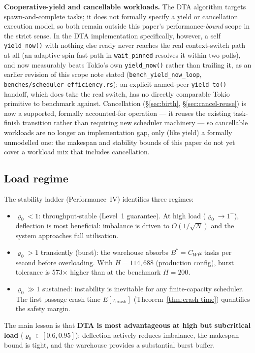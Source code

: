 \documentclass[11pt,a4paper]{report}
\newcommand{\dtact}{\textsc{DTA}}
\begin{document}
\medskip
\noindent\textbf{Cooperative-yield and cancellable workloads.}
The DTA algorithm targets spawn-and-complete tasks; it does not
formally specify a yield or cancellation execution model, so both
remain outside this paper's performance-\emph{bound} scope in the
strict sense. In the \dtact{} implementation specifically, however, a
self \texttt{yield\_now()} with nothing else ready never reaches the
real context-switch path at all (an adaptive-spin fast path in
\texttt{wait\_pinned} resolves it within two polls), and now
measurably beats Tokio's own \texttt{yield\_now()} rather than
trailing it, as an earlier revision of this scope note stated
(\texttt{bench\_yield\_now\_loop},
\texttt{benches/scheduler\_efficiency.rs}); an explicit named-peer
\texttt{yield\_to()} handoff, which does take the real switch, has no
directly comparable Tokio primitive to benchmark against. Cancellation
(\S\ref{sec:birth}, \S\ref{sec:cancel-reuse}) is now a supported,
formally accounted-for operation --- it reuses the existing
task-finish transition rather than requiring new scheduler machinery
--- so cancellable workloads are no longer an implementation gap, only
(like yield) a formally unmodelled one: the makespan and stability
bounds of this paper do not yet cover a workload mix that includes
cancellation.

\subsection{Load regime}

The stability ladder (Performance~IV) identifies three regimes:
\begin{itemize}
  \item $\varrho_0 < 1$: throughput-stable (Level~1 guarantee).
        At high load ($\varrho_0 \to 1^-$), deflection is most
        beneficial: imbalance is driven to $O(1/\sqrt{N})$ and the
        system approaches full utilisation.
  \item $\varrho_0 > 1$ transiently (burst): the warehouse absorbs
        $B^* = C_W \mu$ tasks per second before overloading.
        With $H = 114{,}688$ (production config), burst tolerance
        is 573$\times$ higher than at the benchmark $H=200$.
  \item $\varrho_0 \gg 1$ sustained: instability is inevitable for
        any finite-capacity scheduler.  The first-passage crash time
        $E[\tau_{\mathrm{crash}}]$ (Theorem~\ref{thm:crash-time})
        quantifies the safety margin.
\end{itemize}
The main lesson is that \textbf{DTA is most advantageous at high but
subcritical load} ($\varrho_0 \in [0.6, 0.95]$): deflection actively
reduces imbalance, the makespan bound is tight, and the warehouse
provides a substantial burst buffer.
\end{document}

